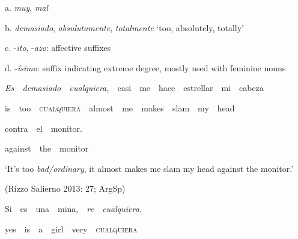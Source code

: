 \begin{styleStandard}
\ \ a. \textit{muy}, \textit{mal }
\end{styleStandard}

\begin{styleStandard}
\ \ b.\textit{ demasiado}, \textit{absulutamente}, \textit{totalmente }‘too, absolutely, totally’
\end{styleStandard}

\begin{styleStandard}
\ \ c. -\textit{ito}, -\textit{azo}: affective suffixes 
\end{styleStandard}

\begin{styleStandard}
\ \ d. -\textit{ísimo}: suffix indicating extreme degree, mostly used with feminine nouns
\end{styleStandard}

\begin{styleStandard}
\ \ \textit{Es\ \ demasiado\ \ cualquiera,}\ \ casi\ \ me\ \ hace\ \ estrellar\ \ mi\ \ cabeza
\end{styleStandard}

\begin{styleStandard}
\ \ is\ \ too\ \ \textsc{cualquiera}\ \ almost\textit{\ \ }me\textit{\ \ }makes\textit{\ \ }slam\ \ my\ \ head
\end{styleStandard}

\begin{styleStandard}
\ \ contra\ \ el\ \ monitor.\textsc{\ \ }\ \ \ \ \ \ \ \ \ \ 
\end{styleStandard}

\begin{styleStandard}
\ \ against\ \ the\ \ monitor\textsc{\ \ }\ \ \ \ \ \ \ \ \ \ 
\end{styleStandard}

\begin{styleStandard}
\ \ ‘It’s too \textit{bad/ordinary}, it almost makes me slam my head against the monitor.’
\end{styleStandard}

\begin{styleStandard}
\ \ (Rizzo Salierno 2013: 27; ArgSp)
\end{styleStandard}

\begin{styleStandard}
\ \ Si\ \ es\ \ una\ \ mina,\ \ \textit{re\ \ cualquiera.}
\end{styleStandard}

\begin{styleStandard}
\ \ yes\ \ is\ \ a\ \ girl\ \ very\ \ \textsc{cualquiera}
\end{styleStandard}

